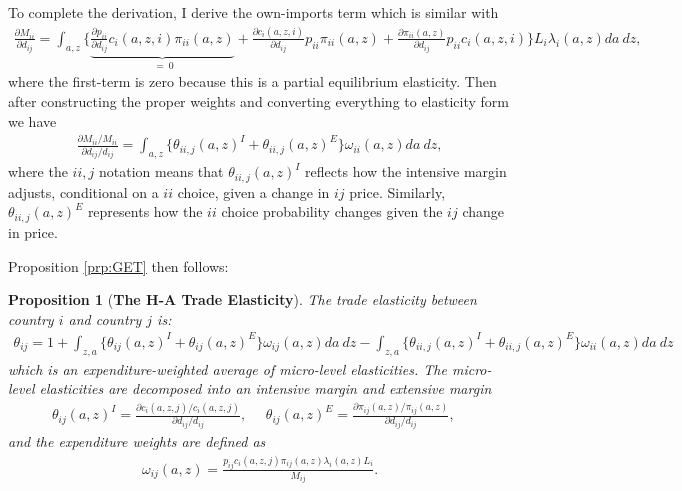 \documentclass[12pt,pdftex]{article}
\newtheorem{prp}{Proposition}
\begin{document}
\begin{onehalfspacing}
To complete the derivation, I derive the own-imports term which is similar with
\begin{align}
\frac{\partial  M_{ii}}{\partial d_{ij}} = \int_{a,z} \bigg \{ \underbrace{\frac{\partial p_{ii}}{\partial d_{ij}} c_{i}(a,z,i) \pi_{ii}(a,z)}_{ \ = \ 0} +  \frac{\partial c_{i}(a,z,i)}{\partial d_{ij}} p_{ii} \pi_{ii}(a,z) + \frac{\partial \pi_{ii}(a,z)}{\partial d_{ij}} p_{ii}c_{i}(a,z,i) \bigg \} L_i \lambda_{i}(a,z)da \ dz,
\end{align}
where the first-term is zero because this is a partial equilibrium elasticity. Then after constructing the proper weights and converting everything to elasticity form we have
\begin{align}
\frac{\partial  M_{ii} / M_{ii}}{\partial d_{ij} / d_{ij}} = \int_{a,z} \bigg \{ \theta_{ii,j}(a,z)^{I} + \theta_{ii,j}(a,z)^{E} \bigg \}\omega_{ii}(a,z)da \ dz,
\end{align}
where the $ii, j$ notation means that $\theta_{ii,j}(a,z)^{I}$ reflects how the intensive margin adjusts, conditional on a $ii$ choice, given a change in $ij$ price. Similarly, $\theta_{ii,j}(a,z)^{E}$ represents how the $ii$ choice probability changes given the $ij$ change in price.

Proposition \ref{prp:GET} then follows:

\setcounter{prp}{2}
\begin{prp}[\textbf{The H-A Trade Elasticity}]The trade elasticity between country $i$ and country $j$ is:
{\footnotesize
\begin{align}
\theta_{ij} = 1 + \int_{z,a} \bigg \{ \theta_{ij}(a,z)^{I} + \theta_{ij}(a,z)^{E} \bigg \}\omega_{ij}(a,z)da \ dz - \int_{z,a} \bigg \{ \theta_{ii,j}(a,z)^{I} + \theta_{ii,j}(a,z)^{E} \bigg \}\omega_{ii}(a,z)da \ dz
\label{apx-eq:trade-elasticity}
\end{align}
}which is an expenditure-weighted average of micro-level elasticities. The micro-level elasticities are decomposed into an intensive margin and extensive margin
{\footnotesize
\begin{align}
\nonumber
\theta_{ij}(a,z)^{I} = \frac{\partial c_{i}(a,z,j)/ c_{i}(a,z,j)}{\partial d_{ij} / d_{ij}}, \ \ \ \ \ \ \theta_{ij}(a,z)^{E} = \frac{\partial \pi_{ij}(a,z) / \pi_{ij}(a,z)}{\partial d_{ij} / d_{ij}}, \ \ \ \
\end{align}
}
and the expenditure weights are defined as
{\footnotesize
\begin{align}
\nonumber
\omega_{ij}(a,z) = \frac{p_{ij}c_{i}(a,z,j)\pi_{ij}(a,z) \lambda_{i}(a,z) L_i}{M_{ij}}.
\end{align}
}
\end{prp}


\end{onehalfspacing}
\end{document}
